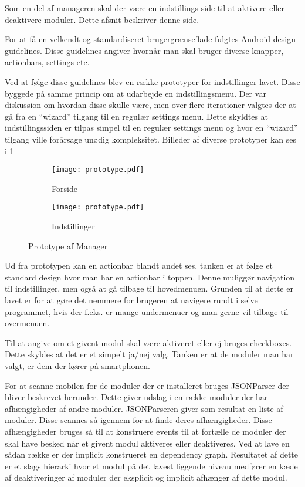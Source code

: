 Som en del af manageren skal der være en indstillings side til at aktivere eller deaktivere moduler. Dette afsnit beskriver denne side.

For at få en velkendt og standardiseret brugergrænseflade fulgtes Android design guidelines.
Disse guidelines angiver hvornår man skal bruger diverse knapper, actionbars, settings etc.
\citep{androiddesign}

Ved at følge disse guidelines blev en række prototyper for indstillinger lavet.
Disse byggede på samme princip om at udarbejde en indstillingsmenu.
Der var diskussion om hvordan disse skulle være, men over flere iterationer valgtes der at gå fra en ``wizard'' tilgang til en regulær settings menu.
Dette skyldtes at indstillingssiden er tilpas simpel til en regulær settings menu og hvor en ``wizard'' tilgang ville forårsage unødig kompleksitet.
Billeder af diverse prototyper kan ses i \cref{fig:prototype-manager}

\begin{figure}[!h]
	\centering
	\begin{subfigure}[b]{0.45\textwidth}
			\texttt{[image: prototype.pdf]}
			\caption{Forside}
	\end{subfigure}
	\begin{subfigure}[b]{0.45\textwidth}
			\texttt{[image: prototype.pdf]}
			\caption{Indstillinger}
	\end{subfigure}
	\caption{Prototype af Manager}
	\label{fig:prototype-manager}
\end{figure}


Ud fra prototypen kan en actionbar blandt andet ses, tanken er at følge et standard design hvor man har en actionbar i toppen.
Denne muliggør navigation til indstillinger, men også at gå tilbage til hovedmenuen.
Grunden til at dette er lavet er for at gøre det nemmere for brugeren at navigere rundt i selve programmet, hvis der f.eks. er mange undermenuer og man gerne vil tilbage til overmenuen.

Til at angive om et givent modul skal være aktiveret eller ej bruges checkboxes.
Dette skyldes at det er et simpelt ja/nej valg. 
Tanken er at de moduler man har valgt, er dem der kører på smartphonen.

For at scanne mobilen for de moduler der er installeret bruges JSONParser der bliver beskrevet herunder.
Dette giver udslag i en række moduler der har afhængigheder af andre moduler.
JSONParseren giver som resultat en liste af moduler. Disse scannes så igennem for at finde deres afhængigheder.
Disse afhængigheder bruges så til at konstruere events til at fortælle de moduler der skal have besked når et givent modul aktiveres eller deaktiveres.
Ved at lave en sådan række er der implicit konstrueret en dependency graph.
Resultatet af dette er et slags hierarki hvor et modul på det lavest liggende niveau medfører en kæde af deaktiveringer af moduler der eksplicit og implicit afhænger af dette modul.
